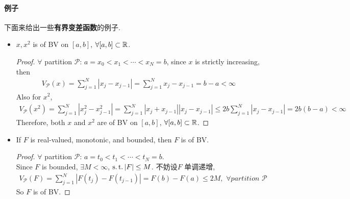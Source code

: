 \newpage
\paragraph{例子}
	下面来给出一些\textbf{有界变差函数}的例子.
	\begin{example}\label{ex 4.4.2}
		\begin{itemize}
			\item $x , x^2$ is of BV on $[a , b]$, $\forall [a , b] \subset \mathbb{R}$.
			
			\vspace{4em}
			\begin{proof}
				$\forall$ partition $\mathcal{P}$: $a = x_0 < x_1 < \cdots < x_N = b$, since $x$ is strictly increasing, then
				\begin{align}
					V_{\mathcal{P}}(x) 
					= \sum_{j = 1}^{N}{\left| x_j - x_{j - 1} \right|}
					= \sum_{j = 1}^{N}{x_j - x_{j - 1}} 
					= b - a < \infty
				\end{align}
				Also for $x^2$, 
				\begin{align}
					V_{\mathcal{P}}(x^2) 
					= \sum_{j = 1}^{N}{\left| x_{j}^2 - x_{j - 1}^2 \right|}
					= \sum_{j = 1}^{N}{\left| x_j + x_{j - 1} \right| \left| x_j - x_{j - 1} \right|}
					\leq 2b \sum_{j = 1}^{N}{\left| x_j - x_{j - 1} \right|}
					= 2b(b - a) < \infty
				\end{align}
				Therefore, both $x$ and $x^2$ are of BV on $[a , b]$, $\forall [a , b] \subset \mathbb{R}$.
			\end{proof}
		
			\vspace{10em}
			
			\item If $F$ is real-valued, monotonic, and bounded, then $F$ is of BV.
			
			\vspace{4em}
			\begin{proof}
				$\forall$ partition $\mathcal{P}$: $a = t_0 < t_1 < \cdots < t_N = b$. \\
				Since $F$ is bounded, $\exists M < \infty$, $\operatorname{s.t.} \left| F \right| \leq M$. 不妨设$F$ 单调递增,
				\begin{align}
					V_{\mathcal{P}}(F) 
					= \sum_{j = 1}^{N}{\left| F(t_j) - F(t_{j - 1}) \right|}
					= F(b) -F(a)
					\leq 2M , \,\, \forall partition \,\, \mathcal{P}
				\end{align}
				So $F$ is of BV.
			\end{proof}
		
			\newpage
			

\end{itemize}
\end{example}
